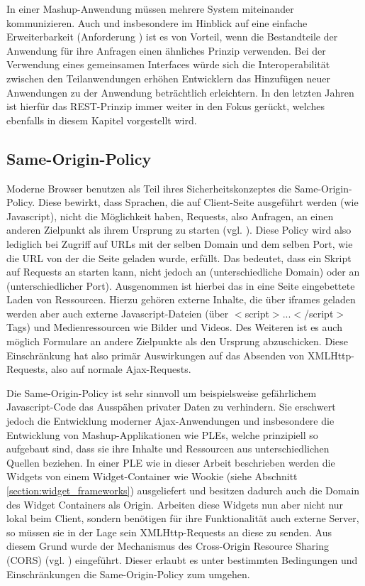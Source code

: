 In einer Mashup-Anwendung müssen mehrere System miteinander kommunizieren. Auch und insbesondere im Hinblick auf eine einfache Erweiterbarkeit (Anforderung ) ist es von Vorteil, wenn die Bestandteile der Anwendung für ihre Anfragen einen ähnliches Prinzip verwenden. Bei der Verwendung eines gemeinsamen Interfaces würde sich die Interoperabilität zwischen den Teilanwendungen erhöhen Entwicklern das Hinzufügen neuer Anwendungen zu der Anwendung beträchtlich erleichtern. In den letzten Jahren ist hierfür das REST-Prinzip immer weiter in den Fokus gerückt, welches ebenfalls in diesem Kapitel vorgestellt wird.
% 
\subsection{Same-Origin-Policy}\label{section:same_origin_policy}
Moderne Browser benutzen als Teil ihres Sicherheitskonzeptes die Same-Origin-Policy. Diese bewirkt, dass Sprachen, die auf Client-Seite ausgeführt werden (wie Javascript), nicht die Möglichkeit haben, Requests, also Anfragen, an einen anderen Zielpunkt als ihrem Ursprung zu starten (vgl. \cite{Ruderman2008}). Diese Policy wird also lediglich bei Zugriff auf URLs mit der selben Domain und dem selben Port, wie die URL von der die Seite geladen wurde, erfüllt. Das bedeutet, dass ein Skript auf  Requests an  starten kann, nicht jedoch an  (unterschiedliche Domain) oder an  (unterschiedlicher Port). Ausgenommen ist hierbei das in eine Seite eingebettete Laden von Ressourcen. Hierzu gehören externe Inhalte, die über iframes geladen werden aber auch externe Javascript-Dateien (über $<$script$>$...$<$/script$>$ Tags) und Medienressourcen wie Bilder und Videos. Des Weiteren ist es auch möglich Formulare an andere Zielpunkte als den Ursprung abzuschicken. Diese Einschränkung hat also primär Auswirkungen auf das Absenden von XMLHttp-Requests, also auf normale Ajax-Requests.

Die Same-Origin-Policy ist sehr sinnvoll um beispielsweise gefährlichem Javascript-Code das Ausspähen privater Daten zu verhindern. Sie erschwert jedoch die Entwicklung moderner Ajax-Anwendungen und insbesondere die Entwicklung von Mashup-Applikationen wie PLEs, welche prinzipiell so aufgebaut sind, dass sie ihre Inhalte und Ressourcen aus unterschiedlichen Quellen beziehen. In einer PLE wie in dieser Arbeit beschrieben werden die Widgets von einem Widget-Container wie Wookie (siehe Abschnitt \ref{section:widget_frameworks}) ausgeliefert und besitzen dadurch auch die Domain des Widget Containers als Origin. Arbeiten diese Widgets nun aber nicht nur lokal beim Client, sondern benötigen für ihre Funktionalität auch externe Server, so müssen sie in der Lage sein XMLHttp-Requests an diese zu senden. Aus diesem Grund wurde der Mechanismus des Cross-Origin Resource Sharing (CORS) (vgl. \cite{vanKesteren2012}) eingeführt. Dieser erlaubt es unter bestimmten Bedingungen und Einschränkungen die Same-Origin-Policy zum umgehen.

